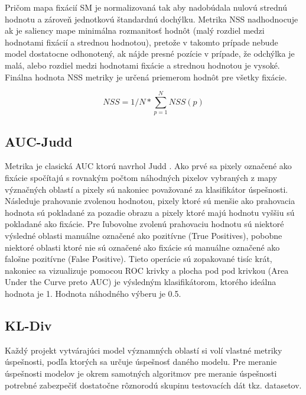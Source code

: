 Pričom mapa fixácií SM je normalizovaná tak aby nadobúdala nulovú strednú hodnotu a zároveň jednotkovú štandardnú dochýlku.
Metrika NSS nadhodnocuje ak je saliency mape minimálna rozmanitosť hodnôt (malý rozdiel medzi hodnotami fixácií a strednou hodnotou), pretože v takomto prípade nebude model dostatocne odhonotený, ak nájde presné pozície v prípade, že odchýlka je malá, alebo
rozdiel medzi hodnotami fixácie a strednou hodnotou je vysoké.
Finálna hodnota NSS metriky je určená priemerom hodnôt pre všetky fixácie\cite{metrics-1}.

\begin{equation}
  NSS = 1/N * \sum_{p=1}^{N}NSS(p)
\end{equation}

\subsection{AUC-Judd}
Metrika je clasická AUC ktorú navrhol Judd \cite{auc-judd}.
Ako prvé sa pixely označené ako fixácie spočítajú s rovnakým počtom náhodných pixelov vybraných z mapy význačných oblastí a pixely sú nakoniec považované za klasifikátor úspešnosti.
Následuje prahovanie zvolenou hodnotou, pixely ktoré sú menšie ako prahovacia hodnota sú pokladané za pozadie obrazu a pixely ktoré majú hodnotu vyššiu sú pokladané ako fixácie.
Pre ľubovolne zvolenú prahovaciu hodnotu sú niektoré výsledné oblasti manuálne označené ako pozitívne (True Positives), pobobne niektoré oblasti ktoré nie sú označené ako fixácie sú manuálne označené ako falošne pozitívne (False Positive).
Tieto operácie sú zopakované tisíc krát, nakoniec sa vizualizuje pomocou ROC krivky a plocha pod pod krivkou (Area Under the Curve preto AUC) je výsledným klasifikátorom, ktorého ideálna hodnota je 1.
Hodnota náhodného výberu je 0.5.

\subsection{KL-Div}

Každý projekt vytvárajúci model významných oblastí si volí vlastné metriky úspešnosti, podľa ktorých sa určuje úspešnosť daného modelu.
Pre meranie úspešnosti modelov je okrem samotných algoritmov pre meranie úspešnosti potrebné zabezpečiť dostatočne rôznorodú skupinu testovacích dát tkz.
datasetov.

